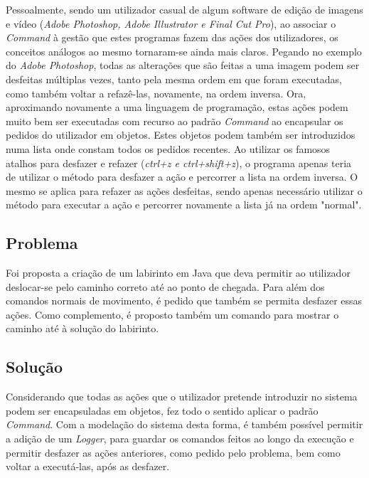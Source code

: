 \documentclass[10pt,portuguese]{article}
\begin{document}
\par Pessoalmente, sendo um utilizador casual de algum software de edição de imagens e vídeo (\textit{Adobe Photoshop, Adobe Illustrator e Final Cut Pro}), ao associar o \textit{Command} à gestão que estes programas fazem das ações dos utilizadores, os conceitos análogos ao mesmo tornaram-se ainda mais claros. Pegando no exemplo do \textit{Adobe Photoshop}, todas as alterações que são feitas a uma imagem podem ser desfeitas múltiplas vezes, tanto pela mesma ordem em que foram executadas, como também voltar a refazê-las, novamente, na ordem inversa. 
Ora, aproximando novamente a uma linguagem de programação, estas ações podem muito bem ser executadas com recurso ao padrão \textit{Command} ao encapsular os pedidos do utilizador em objetos. Estes objetos podem também ser introduzidos numa lista onde constam todos os pedidos recentes. 
Ao utilizar os famosos atalhos para desfazer e refazer (\textit{ctrl+z e ctrl+shift+z}), o programa apenas teria de utilizar o método para desfazer a ação e percorrer a lista na ordem inversa. O mesmo se aplica para refazer as ações desfeitas, sendo apenas necessário utilizar o método para executar a ação e percorrer novamente a lista já na ordem "normal".

\clearpage

\subsection{Problema}

\par Foi proposta a criação de um labirinto em Java que deva permitir ao utilizador deslocar-se pelo caminho correto até ao ponto de chegada. Para além dos comandos normais de movimento, é pedido que também se permita desfazer essas ações. Como complemento, é proposto também um comando para mostrar o caminho até à solução do labirinto.

\subsection{Solução}

\par Considerando que todas as ações que o utilizador pretende introduzir no sistema podem ser encapsuladas em objetos, fez todo o sentido aplicar o padrão \textit{Command}. Com a modelação do sistema desta forma, é também possível permitir a adição de um \textit{Logger}, para guardar os comandos feitos ao longo da execução e permitir desfazer as ações anteriores, como pedido pelo problema, bem como voltar a executá-las, após as desfazer.
\end{document}
